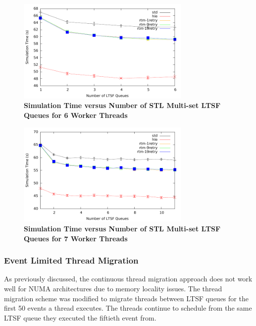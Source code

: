 \documentclass[11pt]{book}
\begin{document}
\begin{figure}[H]
    \centering
    \graphicspath{ {./figures/} }
    \includegraphics[width=0.75\textwidth,keepaspectratio]{hugeepidemicsim-CONTmig-timeVSschedQs-multiset-6thread}
    \caption{\textbf{Simulation Time versus Number of STL Multi-set LTSF Queues for 6
        Worker Threads}}\label{fig:contThrMig_timeVSschq_6threads}
\end{figure}

\begin{figure}[H]
    \centering
    \graphicspath{ {./figures/} }
    \includegraphics[width=0.75\textwidth,keepaspectratio]{hugeepidemicsim-CONTmig-timeVSschedQs-multiset-7thread}
    \caption{\textbf{Simulation Time versus Number of STL Multi-set LTSF Queues for 7
        Worker Threads}}\label{fig:contThrMig_timeVSschq_7threads}
\end{figure}

\subsubsection{Event Limited Thread Migration}

As previously discussed, the continuous thread migration approach does not work
well for NUMA architectures due to memory locality issues.  The thread migration
scheme was modified to migrate threads between LTSF queues for the first 50
events a thread executes.  The threads continue to schedule from the same LTSF
queue they executed the fiftieth event from.  
\end{document}
